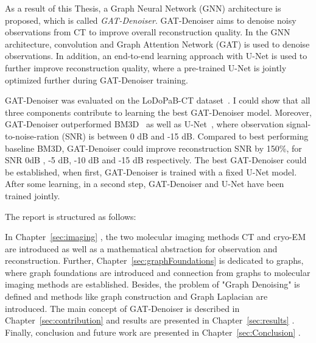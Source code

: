 \clearpage

As a result of this Thesis, a Graph Neural Network (GNN) architecture is proposed, which is called \textit{GAT-Denoiser}.
GAT-Denoiser aims to denoise noisy observations from CT to improve overall reconstruction quality.
In the GNN architecture, convolution and Graph Attention Network (GAT) is used to denoise observations.
In addition, an end-to-end learning approach with U-Net is used to further improve reconstruction quality, 
where a pre-trained U-Net is jointly optimized further during GAT-Denoiser training.

GAT-Denoiser was evaluated on the LoDoPaB-CT dataset~\cite{lodopab-dataset}.
I could show that all three components contribute to learning the best GAT-Denoiser model.
Moreover, GAT-Denoiser outperformed BM3D~\cite{bm3d} as well as U-Net~\cite{unet-tomography},
where observation signal-to-noise-ration (SNR) is between 0 dB and -15 dB.
Compared to best performing baseline BM3D, GAT-Denoiser could improve reconstruction SNR 
by 150\%, for SNR 0dB , -5 dB, -10 dB and -15 dB respectively.
The best GAT-Denoiser could be established, when first, GAT-Denoiser is trained with a fixed U-Net model.
After some learning, in a second step, GAT-Denoiser and U-Net have been trained jointly.


\bigskip

The report is structured as follows: 


In Chapter~\ref{sec:imaging} \textit{}, the two molecular imaging methods
CT and cryo-EM are introduced as well as a mathematical abstraction for observation and reconstruction.
Further, Chapter~\ref{sec:graphFoundations} \textit{} is dedicated to graphs, 
where graph foundations are introduced and connection from graphs to molecular imaging methods are established. 
Besides, the problem of "Graph Denoising" is defined and methods like graph construction and Graph Laplacian are introduced.
The main concept of GAT-Denoiser is described in Chapter~\ref{sec:contribution} \textit{}
and results are presented in Chapter~\ref{sec:results} \textit{}.
Finally, conclusion and future work are presented in Chapter~\ref{sec:Conclusion} \textit{}.

